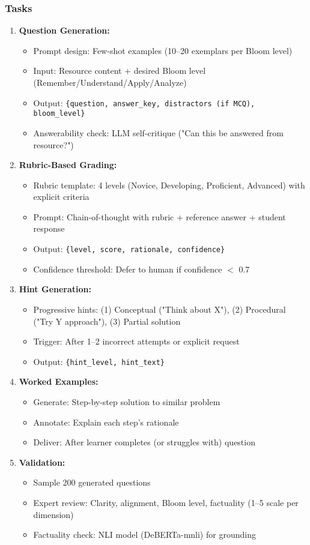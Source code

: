 \documentclass[11pt,letterpaper]{article}
\begin{document}
\subsubsection{Tasks}
\begin{enumerate}
\item \textbf{Question Generation:}
\begin{itemize}
\item Prompt design: Few-shot examples (10--20 exemplars per Bloom level)
\item Input: Resource content + desired Bloom level (Remember/Understand/Apply/Analyze)
\item Output: \texttt{\{question, answer\_key, distractors (if MCQ), bloom\_level\}}
\item Answerability check: LLM self-critique ("Can this be answered from resource?")
\end{itemize}

\item \textbf{Rubric-Based Grading:}
\begin{itemize}
\item Rubric template: 4 levels (Novice, Developing, Proficient, Advanced) with explicit criteria
\item Prompt: Chain-of-thought with rubric + reference answer + student response
\item Output: \texttt{\{level, score, rationale, confidence\}}
\item Confidence threshold: Defer to human if confidence $<$ 0.7
\end{itemize}

\item \textbf{Hint Generation:}
\begin{itemize}
\item Progressive hints: (1) Conceptual ("Think about X"), (2) Procedural ("Try Y approach"), (3) Partial solution
\item Trigger: After 1--2 incorrect attempts or explicit request
\item Output: \texttt{\{hint\_level, hint\_text\}}
\end{itemize}

\item \textbf{Worked Examples:}
\begin{itemize}
\item Generate: Step-by-step solution to similar problem
\item Annotate: Explain each step's rationale
\item Deliver: After learner completes (or struggles with) question
\end{itemize}

\item \textbf{Validation:}
\begin{itemize}
\item Sample 200 generated questions
\item Expert review: Clarity, alignment, Bloom level, factuality (1--5 scale per dimension)
\item Factuality check: NLI model (DeBERTa-mnli) for grounding
\end{itemize}
\end{enumerate}
\end{document}
